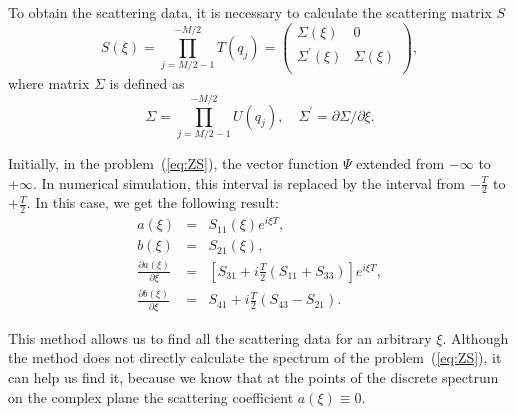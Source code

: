 To obtain the scattering data, it is necessary to calculate the scattering matrix $ S $
\begin{equation}
    S(\xi) = \prod^{-M/2}_{j = M/2-1} T(q_j) = 
    \begin{pmatrix}
        \Sigma(\xi) & 0 \\
        \Sigma^{'}(\xi) & \Sigma(\xi) \\
    \end{pmatrix} {,}
\end{equation}
where matrix $\Sigma$ is defined as 
\begin{equation}
    \Sigma = \prod_{j = M/2-1}^{-M/2} U(q_j) {,} \quad 
    \Sigma^{'} = \partial \Sigma / \partial \xi {.}
\end{equation}

Initially, in the problem~(\ref{eq:ZS}), the vector function $ \Psi $ extended from $ -\infty$ to $ + \infty $. In numerical simulation, this interval is replaced by the interval from $ - \frac{T}{2} $ to $ +\frac{T}{2}$. In this case, we get the following result:
\begin{eqnarray}
    a(\xi) & = & S_{11}(\xi) e^{i\xi T} {,} \nonumber \\
    b(\xi) & = & S_{21}(\xi) {,}  \nonumber \\ 
    \frac{\partial a(\xi)}{\partial \xi} & = & [S_{31} + i \frac{T}{2} 
        (S_{11} + S_{33})]e^{i\xi T } {,} \nonumber \\
    \frac{\partial b(\xi)}{\partial \xi} & = & S_{41} + i\frac{T}{2} (S_{43} - S_{21}) {.} 
    \label{eq:bo_result}
\end{eqnarray}

This method allows us to find all the scattering data for an arbitrary $ \xi $. Although the method does not directly calculate the spectrum of the problem~(\ref{eq:ZS}), it can help us find it, because we know that at the points of the discrete spectrum on the complex plane the scattering coefficient $a (\xi) \equiv 0 $.

